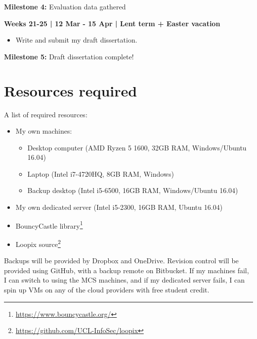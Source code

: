 \documentclass[12pt,a4paper,twoside]{article}
\begin{document}
	\textbf{Milestone 4:} Evaluation data gathered
	
	\textbf{Weeks 21-25 | 12 Mar - 15 Apr | Lent term + Easter vacation}
	
	\begin{itemize}
		\item Write and submit my draft dissertation.
	\end{itemize}
	
	\textbf{Milestone 5:} Draft dissertation complete!
	
	\section*{Resources required}
	
	A list of required resources:
	
	\begin{itemize}
		\item My own machines:
		\begin{itemize}
			\item Desktop computer (AMD Ryzen 5 1600, 32GB RAM, Windows/Ubuntu 16.04)
			\item Laptop (Intel i7-4720HQ, 8GB RAM, Windows)
			\item Backup desktop (Intel i5-6500, 16GB RAM, Windows/Ubuntu 16.04)
		\end{itemize}
		\item My own dedicated server (Intel i5-2300, 16GB RAM, Ubuntu 16.04)
		\item BouncyCastle library\footnote{\url{https://www.bouncycastle.org/}}
		\item Loopix source\footnote{\url{https://github.com/UCL-InfoSec/loopix}}
	\end{itemize}
	
	Backups will be provided by Dropbox and OneDrive. Revision control will be provided using GitHub, with a backup remote on Bitbucket. If my machines fail, I can switch to using the MCS machines, and if my dedicated server fails, I can spin up VMs on any of the cloud providers with free student credit.
	
	
	
	
\end{document}
